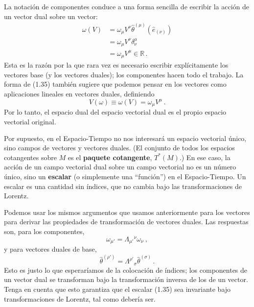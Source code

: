 \documentclass[11pt,b5paper,openany,twoside]{book}
\newcommand{\e}[1]{\hat{e}_{(#1)}}
\newcommand{\ztheta}[1]{{\hat{\theta}}^{(#1)}}
\begin{document}
La notación de componentes conduce a una forma sencilla de escribir la acción de un vector dual sobre un vector:
\begin{align}
\omega(V) &=  \omega_\mu V^\nu \ztheta{\mu}(\e\nu)\nonumber \\
&=  \omega_\mu V^\nu \delta^\mu_\nu\nonumber \\
&=  \omega_\mu V^\mu \in \mathbb{R} \,. \label{1.35}
\end{align}
Esta es la razón por la que rara vez es necesario escribir explícitamente los vectores base (y los vectores duales); los componentes hacen todo el trabajo.
La forma de (1.35) también sugiere que podemos pensar en los vectores como aplicaciones lineales en vectores duales, definiendo
\begin{equation}
V(\omega) \equiv \omega(V) = \omega_\mu V^\mu\,.\label{1.36}
\end{equation}
Por lo tanto, el espacio dual del espacio vectorial dual es el propio espacio vectorial original.

Por supuesto, en el Espacio-Tiempo no nos interesará un espacio vectorial único, sino campos de vectores y vectores duales.
(El conjunto de todos los espacios cotangentes sobre $M$ es el {\bf paquete cotangente}, $T^*(M)$.)
En ese caso, la acción de un campo vectorial dual sobre un campo vectorial no es un número único, sino un {\bf escalar} (o simplemente una ``función'') en el Espacio-Tiempo.
Un escalar es una cantidad sin índices, que no cambia bajo las transformaciones de Lorentz.

Podemos usar los mismos argumentos que usamos anteriormente para los vectores para derivar las propiedades de transformación de vectores duales.
Las respuestas son, para los componentes,
\begin{equation}
\omega_{\mu'} = \Lambda_{\mu'}{}^\nu\omega_\nu\ ,\label{1.37}
\end{equation}
y para vectores duales de base,
\begin{equation}
 \ztheta{\rho'} = \Lambda^{\rho'}{}_\sigma \ztheta{\sigma}\,.\label{1.38}
\end{equation}
Esto es justo lo que esperaríamos de la colocación de índices; los componentes de un vector dual se transforman bajo la transformación inversa de los de un vector.
Tenga en cuenta que esto garantiza que el escalar (1.35) sea invariante bajo transformaciones de Lorentz, tal como debería ser.
\end{document}
